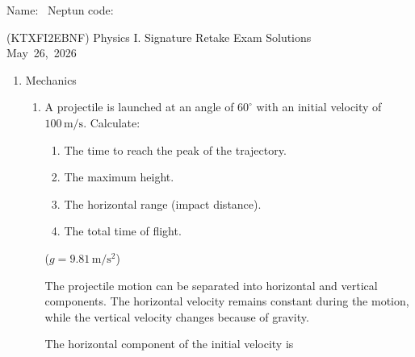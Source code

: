 \documentclass[letterpaper,12pt]{letter}
\begin{document}
Name: \hrulefill\ Neptun code: \hrulefill

\bigskip

\begin{center}
(KTXFI2EBNF) Physics I. Signature Retake Exam Solutions\\
May~26,~2026
\end{center}

\bigskip

\begin{enumerate}[label=\Roman*.]

\item Mechanics

\begin{enumerate}[label=\arabic*.]

\item A projectile is launched at an angle of $60^\circ$ with an initial velocity of $100\,\mathrm{m/s}$. 
Calculate:
\begin{enumerate}
    \item[(a)] The time to reach the peak of the trajectory.
    \item[(b)] The maximum height.
    \item[(c)] The horizontal range (impact distance).
    \item[(d)] The total time of flight.
\end{enumerate}
($g=9.81\,\mathrm{m/s^2}$)

\bigskip

\begin{center}
\end{center}

The projectile motion can be separated into horizontal and vertical components. The horizontal velocity remains constant during the motion, while the vertical velocity changes because of gravity.

The horizontal component of the initial velocity is


\end{enumerate}
\end{enumerate}
\end{document}
